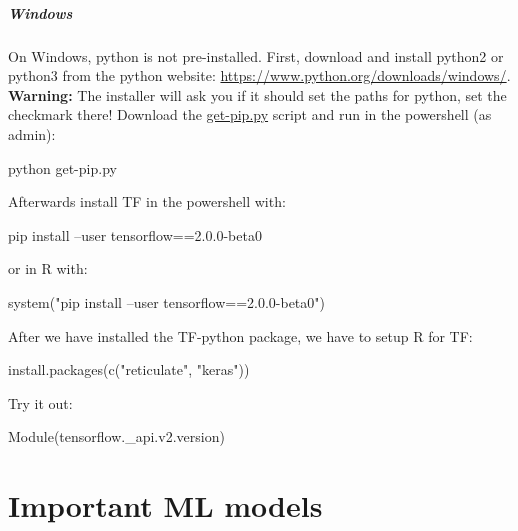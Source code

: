 \documentclass[a4paper,twoside]{tufte-book}\usepackage[]{graphicx}\usepackage[]{color}
\begin{document}
\paragraph{Windows}\label{Windows} 
On Windows, python is not pre-installed. 
%
First, download and install python2 or python3 from the python website: \href{https://www.python.org/downloads/windows/}{https://www.python.org/downloads/windows/}. 
%
\textbf{Warning:} The installer will ask you if it should set the paths for python, set the checkmark there!
%
Download the \href{https://bootstrap.pypa.io/get-pip.py}{get-pip.py} script and run in the powershell (as admin):
%
\begin{Schunk}
\begin{Sinput}
python get-pip.py
\end{Sinput}
\end{Schunk}
%
Afterwards install TF in the powershell with:
\begin{Schunk}
\begin{Sinput}
pip install --user tensorflow==2.0.0-beta0
\end{Sinput}
\end{Schunk}
%
or in R with:
\begin{Schunk}
\begin{Sinput}
system("pip install --user tensorflow==2.0.0-beta0")
\end{Sinput}
\end{Schunk}


After we have installed the TF-python package, we have to setup R for TF:
\begin{Schunk}
\begin{Sinput}
install.packages(c("reticulate", "keras"))
\end{Sinput}
\end{Schunk}
Try it out:
\begin{Schunk}
\begin{Soutput}
Module(tensorflow._api.v2.version)
\end{Soutput}
\end{Schunk}



\chapter{Important ML models}
\end{document}
